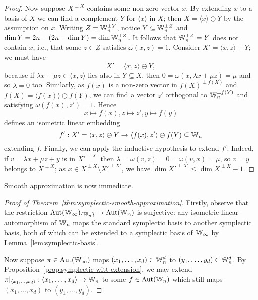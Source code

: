 \begin{proof}
    Now suppose $X^{\perp X}$ contains some non-zero vector $x$.
    By extending $x$ to a basis of $X$ we can find a complement $Y$ for $\langle x \rangle$ in $X$;
    then $X = \langle x \rangle \ominus Y$ by the assumption on $x$.
    Writing $Z = \mathbb{W}_n^{\perp Y}$, 
    notice $Y \subseteq \mathbb{W}_n^{\perp Z}$ and $\dim Y = 2n - (2n - \dim Y) = \dim \mathbb{W}_n^{\perp Z}$.
    It follows that $\mathbb{W}_n^{\perp Z} = Y$ does not contain $x$,
    i.e., that some $z \in Z$ satisfies $\omega(x, z) = 1$.
    Consider $X' = \langle x, z \rangle + Y$;
    we must have 
    \[
        X' = \langle x, z \rangle \ominus Y,
    \]
    because if $\lambda x + \mu z \in \langle x, z \rangle$ lies also in $Y \subseteq X$,  
    then $0 = \omega(x, \lambda x + \mu z) = \mu$ and so $\lambda = 0$ too.    
    Similarly, as $f(x)$ is a non-zero vector in 
        $f(X)^{\perp f(X)}$ and $f(X) = \langle f(x) \rangle \ominus f(Y)$,
    we can find a vector $z'$ orthogonal to $\mathbb{W}_n^{\perp f(Y)}$ and satisfying $\omega(f(x), z') = 1$.
    Hence \[
        x \mapsto f(x), z \mapsto z', y \mapsto f(y)
    \]
    defines an isometric linear embedding
    \[
        f' : X' = \langle x, z \rangle \ominus Y 
        \to \langle f(x), z' \rangle \ominus f(Y) \subseteq \mathbb{W}_n
    \]
    extending $f$.
    Finally, we can apply the inductive hypothesis to extend $f'$.
    Indeed, if $v = \lambda x + \mu z + y$ is in $X'^{\perp X'}$ 
    then $\lambda = \omega(v, z) = 0 = \omega(v, x) = \mu$,
    so $v = y$ belongs to $X^{\perp X}$;
    as $x \in X^{\perp X} \setminus X'^{\perp X'}$, 
    we have $\dim X'^{\perp X'} \leq \dim X^{\perp X} - 1$.
\end{proof}

Smooth approximation is now immediate.

\begin{proof}[Proof of Theorem~\ref{thm:symplectic-smooth-approximation}]
    Firstly, observe that the restriction 
        $\operatorname{Aut}(\mathbb{W}_\infty)_{\{\mathbb{W}_n\}} \to \operatorname{Aut}(\mathbb{W}_n)$ 
    is surjective:
    any isometric linear automorphism of $\mathbb{W}_n$ maps the standard symplectic basis to another symplectic basis, 
    both of which can be extended to a symplectic basis of $\mathbb{W}_\infty$ by Lemma~\ref{lem:symplectic-basis}.

    Now suppose $\pi \in \operatorname{Aut}(\mathbb{W}_\infty)$ maps $(x_1, \dots, x_d) \in \mathbb{W}_n^d$ 
    to $(y_1, \dots, y_d) \in \mathbb{W}_n^d$.
    By Proposition~\ref{prop:symplectic-witt-extension}, we may extend 
        $\pi|_{\langle x_1, \dots, x_d \rangle} : \langle x_1, \dots, x_d \rangle \to \mathbb{W}_n$ 
    to some $f \in \operatorname{Aut}(\mathbb{W}_n)$ which still maps $(x_1, \dots, x_d)$ to $(y_1, \dots, y_d)$.
\end{proof}

